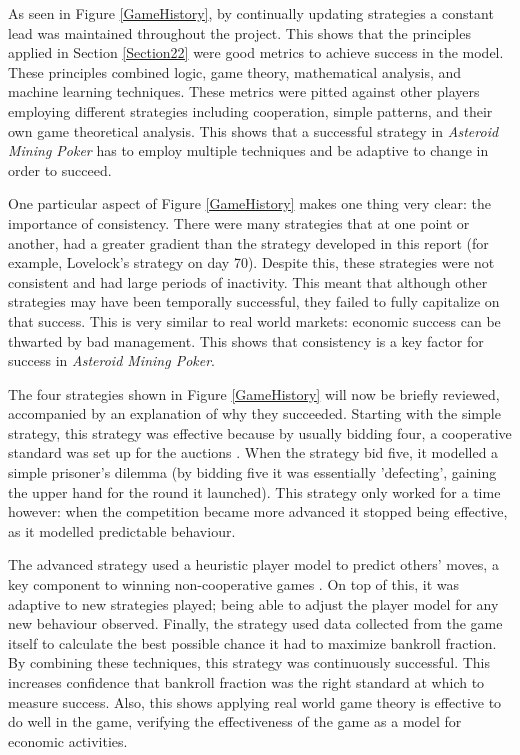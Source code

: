 \documentclass[11pt, twoside]{article}
\begin{document}
As seen in Figure \ref{GameHistory}, by continually updating strategies a constant lead was maintained throughout the project. This shows that the principles applied in Section \ref{Section22} were good metrics to achieve success in the model. These principles combined logic, game theory, mathematical analysis, and machine learning techniques. These metrics were pitted against other players employing different strategies including cooperation, simple patterns, and their own game theoretical analysis. This shows that a successful strategy in \textit{Asteroid Mining Poker} has to employ multiple techniques and be adaptive to change in order to succeed. 

One particular aspect of Figure \ref{GameHistory} makes one thing very clear: the importance of consistency. There were many strategies that at one point or another, had a greater gradient than the strategy developed in this report (for example, Lovelock's strategy on day 70). Despite this, these strategies were not consistent and had large periods of inactivity. This meant that although other strategies may have been temporally successful, they failed to fully capitalize on that success. This is very similar to real world markets: economic success can be thwarted by bad management. This shows that consistency is a key factor for success in \textit{Asteroid Mining Poker}.

The four strategies shown in Figure \ref{GameHistory} will now be briefly reviewed, accompanied by an explanation of why they succeeded. Starting with the simple strategy, this strategy was effective because by usually bidding four, a cooperative standard was set up for the auctions \cite{lebrun1996existence}. When the strategy bid five, it modelled a simple prisoner's dilemma (by bidding five it was essentially 'defecting’, gaining the upper hand for the round it launched). This strategy only worked for a time however: when the competition became more advanced it stopped being effective, as it modelled predictable behaviour.

The advanced strategy used a heuristic player model to predict others' moves, a key component to winning non-cooperative games \cite{nash1951non}. On top of this, it was adaptive to new strategies played; being able to adjust the player model for any new behaviour observed. Finally, the strategy used data collected from the game itself to calculate the best possible chance it had to maximize bankroll fraction. By combining these techniques, this strategy was continuously successful. This increases confidence that bankroll fraction was the right standard at which to measure success. Also, this shows applying real world game theory is effective to do well in the game, verifying the effectiveness of the game as a model for economic activities.
\end{document}
